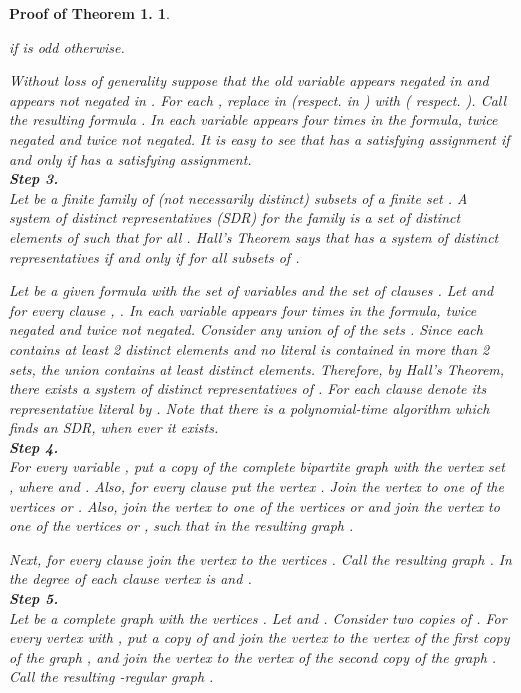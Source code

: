 \documentclass[
final
]{dmtcs-episciences}
\newtheorem{preali}{{\bf Proof of Theorem 1.}}
\newenvironment{ali}[1]{\begin{preali}{\rm
			#1}\hfill{}}{\end{preali}}
\begin{document}
\begin{ali}
{		\begin{center}
			   if   is odd   otherwise. 
		\end{center}
		
		Without loss of generality suppose that the old variable  appears negated in  and appears not negated in . For each ,  replace  in  (respect.  in ) with  ( respect. ). Call the resulting formula . In  each variable appears four
		times in the formula, twice negated and twice not negated. It is easy to see that  has a  satisfying assignment if and only if  has a  satisfying assignment.\\
		{{\bf Step 3.}}\\
		Let  be a finite family of (not necessarily distinct) subsets
		of a finite set . A system of distinct representatives (SDR) for the family  is a
		set  of distinct elements of  such that  for all . Hall's Theorem says that  has a system of distinct representatives if
		and only if  for all subsets  of  \cite{MR1367739}.
		
		Let  be a given formula with the set of variables  and the set of clauses .
		Let  and for every clause , .
		In  each variable appears four
		times in the formula, twice negated and twice not negated.
		Consider any union of  of the sets . Since each  contains at least 2 distinct elements and no literal is contained in more than 2 sets, the union contains at least  distinct
		elements. Therefore, by   Hall's Theorem, there exists a system of distinct representatives
		of . For each clause  denote its representative literal by . Note that there is a polynomial-time algorithm which finds an SDR, when ever it exists.\\
		{{\bf Step 4.}}\\
		For every variable , put a copy of the complete bipartite graph  with the vertex set , where  and .
		Also, for every clause  put the vertex .
		Join the vertex  to one of the vertices  or . Also, join the vertex  to one of the vertices  or  and join the vertex  to one of the vertices  or , such that in the resulting graph .
		
		Next, for every clause  join the vertex  to the vertices .
		Call the resulting graph . In  the degree of each clause vertex  is  and .\\
		{{\bf Step 5.}}\\
		Let  be a complete graph with the vertices . Let  and . Consider two copies of . For every vertex  with , put a copy of  and join the vertex  to the vertex  of the first copy of the graph , and join the vertex   to the vertex  of the second copy of the graph .
		Call the resulting -regular graph .
		
}
\end{ali}
\end{document}
